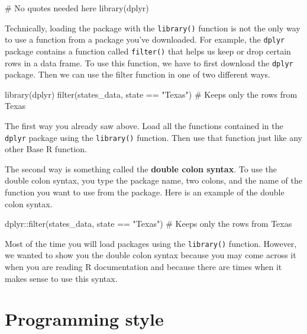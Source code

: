 \documentclass[
  letterpaper,
  DIV=11,
  numbers=noendperiod]{scrreprt}
\newenvironment{Shaded}{\begin{snugshade}}{\end{snugshade}}
\newcommand{\CommentTok}[1]{\textcolor[rgb]{0.37,0.37,0.37}{#1}}
\newcommand{\FunctionTok}[1]{\textcolor[rgb]{0.28,0.35,0.67}{#1}}
\newcommand{\NormalTok}[1]{\textcolor[rgb]{0.00,0.23,0.31}{#1}}
\newcommand{\SpecialCharTok}[1]{\textcolor[rgb]{0.37,0.37,0.37}{#1}}
\newcommand{\StringTok}[1]{\textcolor[rgb]{0.13,0.47,0.30}{#1}}
\begin{document}
\begin{Shaded}
\begin{Highlighting}[]
\CommentTok{\# No quotes needed here}
\FunctionTok{library}\NormalTok{(dplyr)}
\end{Highlighting}
\end{Shaded}

Technically, loading the package with the \texttt{library()} function is
not the only way to use a function from a package you've downloaded. For
example, the \texttt{dplyr} package contains a function called
\texttt{filter()} that helps us keep or drop certain rows in a data
frame. To use this function, we have to first download the
\texttt{dplyr} package. Then we can use the filter function in one of
two different ways.

\begin{Shaded}
\begin{Highlighting}[]
\FunctionTok{library}\NormalTok{(dplyr)}
\FunctionTok{filter}\NormalTok{(states\_data, state }\SpecialCharTok{==} \StringTok{"Texas"}\NormalTok{) }\CommentTok{\# Keeps only the rows from Texas}
\end{Highlighting}
\end{Shaded}

The first way you already saw above. Load all the functions contained in
the \texttt{dplyr} package using the \texttt{library()} function. Then
use that function just like any other Base R function.

The second way is something called the \textbf{double colon syntax}. To
use the double colon syntax, you type the package name, two colons, and
the name of the function you want to use from the package. Here is an
example of the double colon syntax.

\begin{Shaded}
\begin{Highlighting}[]
\NormalTok{dplyr}\SpecialCharTok{::}\FunctionTok{filter}\NormalTok{(states\_data, state }\SpecialCharTok{==} \StringTok{"Texas"}\NormalTok{) }\CommentTok{\# Keeps only the rows from Texas}
\end{Highlighting}
\end{Shaded}

Most of the time you will load packages using the \texttt{library()}
function. However, we wanted to show you the double colon syntax because
you may come across it when you are reading R documentation and because
there are times when it makes sense to use this syntax.

\section{Programming style}\label{programming-style}
\end{document}
